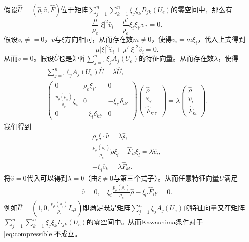 \documentclass{article}
\begin{document}
假设$\hat{U} = (\hat{\rho}, \hat{ v },\hat{F})$位于矩阵$\sum_{j=1}^n \sum_{k=1}^n  \xi_j \xi_k D_{jk}(U_e)$的零空间中，那么有
\begin{equation*}
    \frac{\mu}{\rho_e} |\xi|^2 \hat{v}_i + \frac{\mu'}{\rho_e} \xi_i \xi_{i'} \hat{v}_{i'} = 0.
\end{equation*}
假设$v_{i} \neq = 0$，$v$与$\xi$方向相同，从而存在数$m \neq 0$，使得$v_i = m \xi_i$，代入上式得到
\begin{equation*}
    \mu |\xi|^2 \hat{v}_i + \mu' |\xi|^2 \hat{v}_i = 0. 
\end{equation*}
从而$v=0$。假设$\hat{U}$也是矩阵$ \sum_{j=1}^n \xi_j A_j(U_e)$的特征向量。从而存在数$\lambda$，使得
\begin{eqnarray*}
    \sum_{j=1}^n \xi_j A_j(U_e)\hat{U} = \lambda \hat{U}, \\
     \left( \begin{array}{ccc} 0 & \rho_e \xi_{i'} & 0 \\
    \frac{p_\rho(\rho_e)}{\rho_e} \xi_i & 0 & -\xi_{l'} \delta_{ik'} \\
    0 & - \xi_{l}\delta_{ki'}  & 0 \end{array} \right)
    \left(\begin{array}{c}
        \hat{\rho} \\ \hat{ v}_{i'} \\ \hat{F}_{k'l'}
    \end{array} \right) = \lambda
    \left(\begin{array}{c}
        \hat{\rho} \\ \hat{ v }_i \\ \hat{F}_{kl}
    \end{array} \right).
\end{eqnarray*}
我们得到
\begin{eqnarray*}
    \rho_e \xi \cdot \hat{v}  = \lambda \hat{\rho} , \\
    \frac{p_\rho(\rho_e)}{\rho_e} \hat{\rho} \xi_i - \hat{F}_{il} \xi_l = \lambda \hat{v}_i, \\
    -\xi_l \hat{v}_k = \lambda \hat{F}_{kl}.
\end{eqnarray*}
将$\hat{v}=0$代入可以得到$\lambda = 0$（由$\xi \neq 0$与第三个式子）。从而任意特征向量$U$满足
\begin{eqnarray} \label{eq:linear}
    \hat{ v }=0, \quad \xi_i \frac{p_\rho(\rho_e)}{\rho_e} \hat{\rho} - \xi_{l'} \hat{F}_{il'} = 0.
\end{eqnarray}
例如$\hat{U} = (1,0,\frac{p_\rho(\rho_e)}{\rho_e} I_{n^2})$即满足既是矩阵$ \sum_{j=1}^n \xi_j A_j(U_e)$的特征向量又在矩阵$\sum_{j=1}^n \sum_{k=1}^n \xi_j \xi_k D_{jk}(U_e)$的零空间中。从而Kawashima条件对于\eqref{eq:compressible}不成立。
\end{document}
